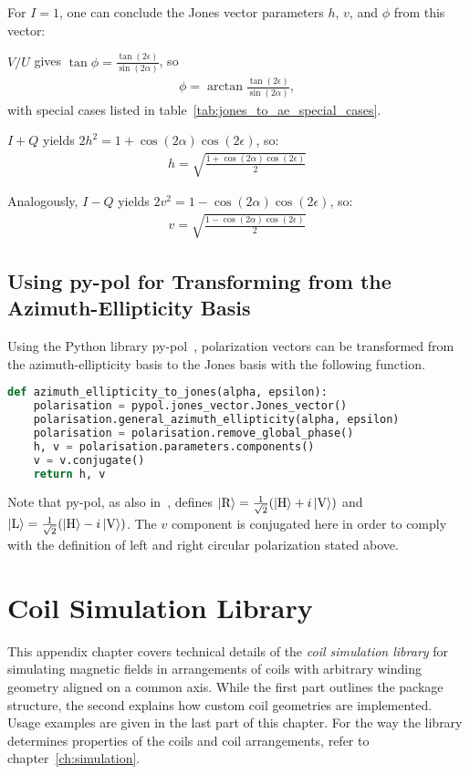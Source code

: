 For $I = 1$, one can conclude the Jones vector parameters $h$, $v$, and $\phi$ from this vector:

$V / U$ gives $\tan \phi = \frac{\tan(2\epsilon)}{\sin(2\alpha)}$, so
\begin{align}
    \phi = \arctan \frac{\tan(2\epsilon)}{\sin(2\alpha)},
\end{align}
with special cases listed in table~\ref{tab:jones_to_ae_special_cases}.

$I + Q$ yields $ 2 h^2 = 1 + \cos(2\alpha) \cos(2\epsilon)$, so:
\begin{align}
    h = \sqrt{\frac{1 + \cos(2\alpha) \cos(2\epsilon)}{2}}
\end{align}

Analogously, $I - Q$ yields $ 2 v^2 = 1 - \cos(2\alpha) \cos(2\epsilon)$, so:
\begin{align}
    v = \sqrt{\frac{1 - \cos(2\alpha) \cos(2\epsilon)}{2}}
\end{align}

\section*{Using py-pol for Transforming from the Azimuth-Ellipticity Basis}
Using the Python library py-pol~\cite{noauthor_python_nodate}, polarization vectors can be transformed from the azimuth-ellipticity basis to the Jones basis with the following function.
\begin{lstlisting}[language=Python]
def azimuth_ellipticity_to_jones(alpha, epsilon):
    polarisation = pypol.jones_vector.Jones_vector()
    polarisation.general_azimuth_ellipticity(alpha, epsilon)
    polarisation = polarisation.remove_global_phase()
    h, v = polarisation.parameters.components()
    v = v.conjugate()
    return h, v
\end{lstlisting}
Note that py-pol, as also in~\cite{trager_springer_2012}, defines $\Ket{\text{R}} = \frac{1}{\sqrt{2}}(\Ket{\text{H}}+i\Ket{\text{V}})$ and $\Ket{\text{L}} = \frac{1}{\sqrt{2}}(\Ket{\text{H}}-i\Ket{\text{V}})$. The $v$ component is conjugated here in order to comply with the definition of left and right circular polarization stated above.



\chapter{Coil Simulation Library}\label{ch:coil_simulation_library}
This appendix chapter covers technical details of the \textit{coil simulation library} for simulating magnetic fields in arrangements of coils with arbitrary winding geometry aligned on a common axis. While the first part outlines the package structure,  the second explains how custom coil geometries are implemented. Usage examples are given in the last part of this chapter. For the way the library determines properties of the coils and coil arrangements, refer to chapter~\ref{ch:simulation}.


